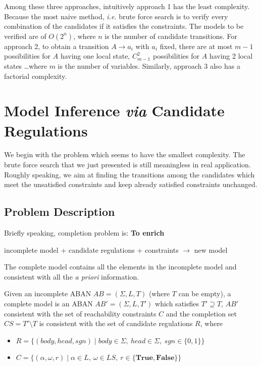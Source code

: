 Among these three approaches, intuitively approach 1 has the least complexity. 
Because the most naive method, \textit{i.e.} brute force search is to verify every combination of the candidates if it satisfies the constraints. 
The models to be verified are of $O(2^n)$, where $n$ is the number of candidate transitions.
For approach 2, to obtain a transition $A\to a_i$ with $a_i$ fixed, there are at most $m-1$ possibilities for $A$ having one local state, $C_{m-1}^2$ possibilities for $A$ having 2 local states \ldots where $m$ is the number of variables.
Similarly, approach 3 also has a factorial complexity.

\section{Model Inference \textit{via} Candidate Regulations}\label{sec:modelInference}
We begin with the problem which seems to have the smallest complexity.
The brute force search that we just presented is still meaningless in real application.
Roughly speaking, we aim at finding the transitions among the candidates which meet the unsatisfied constraints and keep already satisfied constraints unchanged.

\subsection{Problem Description}
Briefly speaking, completion problem is:
\textbf{To enrich}

incomplete model + candidate regulations + constraints $\to$ new model

The complete model contains all the elements in the incomplete model and consistent with all the \textit{a priori} information. 

\begin{definition}
    Given an incomplete ABAN $AB=(\Sigma, L, T)$ (where $T$ can be empty), a complete model is an ABAN $AB'=(\Sigma, L, T')$ which satisfies $T'\supseteq T$, $AB'$ consistent with the set of reachability constraints $C$ and the completion set $CS=T'\setminus T$ is consistent with the set of candidate regulations $R$, where
    \begin{itemize}
        \item $R=\{(body,head,sgn)\mid body\in \Sigma,\ head\in \Sigma,\ sgn\in \{0,1\}\}$ 
        \item $C=\{(\alpha,\omega,r)\mid\alpha \in L,\ \omega\in LS,\ r\in \{\mathbf{True,False}\}\}$
    \end{itemize}
\end{definition}

